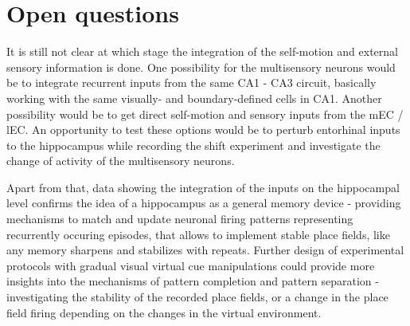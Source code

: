 \section{Open questions}
\label{sec:open_questions}

It is still not clear at which stage the integration of the self-motion and external sensory information is done. One possibility for the multisensory neurons would be to integrate recurrent inputs from the same CA1 - CA3 circuit, basically working with the same visually- and boundary-defined cells in CA1. Another possibility would be to get direct self-motion and sensory inputs from the mEC / lEC. An opportunity to test these options would be to perturb entorhinal inputs to the hippocampus while recording the shift experiment and investigate the change of activity of the multisensory neurons.

Apart from that, data showing the integration of the inputs on the hippocampal level confirms the idea of a hippocampus as a general memory device - providing mechanisms to match and update neuronal firing patterns representing recurrently occuring episodes, that allows to implement stable place fields, like any memory sharpens and stabilizes with repeats. Further design of experimental protocols with gradual visual virtual cue manipulations could provide more insights into the mechanisms of pattern completion and pattern separation - investigating the stability of the recorded place fields, or a change in the place field firing depending on the changes in the virtual environment.
